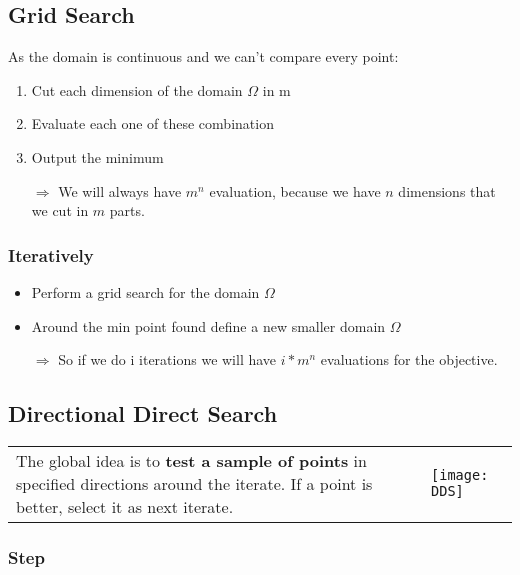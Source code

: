 \subsection{Grid Search}

As the domain is continuous and we can't compare every point:
\begin{enumerate}
    \item Cut each dimension of the domain $\Omega$ in m
    \item Evaluate each one of these combination 
    \item Output the minimum

    \item[$\Rightarrow$]  We will always have $m^n$ evaluation,
        because we have $n$ dimensions that
we cut in $m$ parts.
\end{enumerate}

\subsubsection{Iteratively}
\begin{itemize}
    \item Perform a grid search for the domain $\Omega$ 
    \item Around the min point found define a new smaller domain
        $\Omega$ 
    \item[$\Rightarrow$] So if we do i iterations we will have $i *
        m^n$ evaluations for the objective.
\end{itemize}

\subsection{Directional Direct Search}

\begin{tabular}{m{12cm}m{3cm}}
The global idea is to \textbf{test a sample of points} in specified
directions around the iterate.
If a point is better, select it as next iterate.
&
\texttt{[image: DDS]}
\end{tabular}

\subsubsection{Step}

